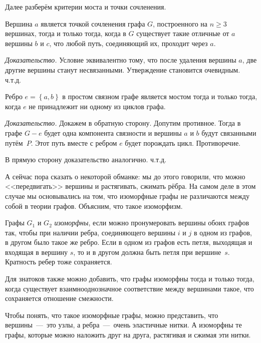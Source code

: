 	Далее разберём критерии моста и точки сочленения.
	
\begin{statement}
	Вершина $a$ является точкой сочленения графа $G$, построенного на $n \geqslant 3$ вершинах, тогда и только тогда, когда в $G$ существует такие отличные от $a$ вершины $b$ и $c$, что любой путь, соединяющий их, проходит через $a$.
	
	\emph{Доказательство.} Условие эквивалентно тому, что после удаления вершины $a$, две другие вершины станут несвязанными. Утверждение становится очевидным. ч.т.д.
\end{statement}

\begin{statement}
	Ребро $e = \left\lbrace a, b \right\rbrace$ в простом связном графе является мостом тогда и только тогда, когда $e$ не принадлежит ни одному из циклов графа.
	
	\emph{Доказательство.} Докажем в обратную сторону. Допутим противное. Тогда в графе $G - e$ будет одна компонента связности и вершины $a$ и $b$ будут связанными путём~$P$. Этот путь вместе с ребром $e$ будет порождать цикл. Противоречие.
	
	В прямую сторону доказательство аналогично. ч.т.д.
\end{statement}


	А сейчас пора сказать о некоторой обманке: мы до этого говорили, что можно <<передвигать>> вершины и растягивать, сжимать рёбра. На самом деле в этом случае мы основывались на том, что изоморфные графы не различаются между собой в теории графов. Объясним, что такое изоморфизм.

\begin{definition}
Графы $G_1$ и $G_2$ \emph{изоморфны}, если можно пронумеровать вершины обоих графов так, чтобы при наличии ребра, соединяющего вершины $i$ и $j$ в одном из графов, в другом было такое же ребро. Если в одном из графов есть петля, выходящая и входящая в вершину $s$, то и в другом должна быть петля при вершине~$s$. Кратность ребер тоже сохраняется.
\end{definition}

	Для знатоков также можно добавить, что графы изоморфны тогда и только тогда, когда существует взаимнооднозначное соответствие между вершинами такое, что сохраняется отношение смежности.

	Чтобы понять, что такое изоморфные графы, можно представить, что вершины~---~это узлы, а ребра~---~очень эластичные нитки. А изоморфны те графы, которые можно наложить друг на друга, растягивая и сжимая эти нитки.

